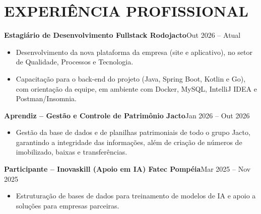 \documentclass[9pt,a4paper]{extarticle}
\newcommand{\entry}[2]{\vspace{2pt}\noindent\textbf{#1}\hfill{\color{gray}#2}\par}
\begin{document}
\section*{EXPERIÊNCIA PROFISSIONAL}
\entry{Estagiário de Desenvolvimento Fullstack \textperiodcentered{} Rodojacto}{Out 2026 – Atual}
\begin{itemize}
  \item Desenvolvimento da nova plataforma da empresa (site e aplicativo), no setor de Qualidade, Processos e Tecnologia.
  \item Capacitação para o back-end do projeto (Java, Spring Boot, Kotlin e Go), com orientação da equipe, em ambiente com Docker, MySQL, IntelliJ IDEA e Postman/Insomnia.
\end{itemize}
\entry{Aprendiz – Gestão e Controle de Patrimônio \textperiodcentered{} Jacto}{Jan 2026 – Out 2026}
\begin{itemize}
  \item Gestão da base de dados e de planilhas patrimoniais de todo o grupo Jacto, garantindo a integridade das informações, além de criação de números de imobilizado, baixas e transferências.
\end{itemize}
\entry{Participante – Inovaskill (Apoio em IA) \textperiodcentered{} Fatec Pompéia}{Mar 2025 – Nov 2025}
\begin{itemize}
  \item Estruturação de bases de dados para treinamento de modelos de IA e apoio a soluções para empresas parceiras.
\end{itemize}
\end{document}
